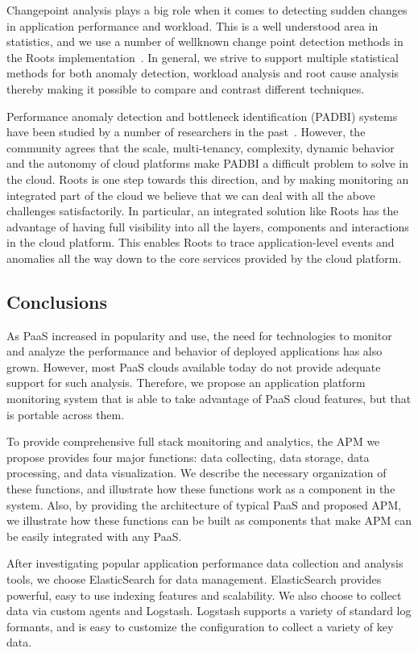 Changepoint analysis plays a big role when it comes to detecting
sudden changes in application performance and workload. This is a well
understood area in statistics, and we use a number of wellknown 
change point detection methods in the Roots implementation~\cite{killick2012optimal,cl93}. 
In general, we strive to support multiple statistical methods for
both anomaly detection, workload analysis and root cause analysis
thereby making it possible to compare and contrast different techniques.

Performance anomaly detection and bottleneck identification (PADBI) systems
have been studied by a number of researchers in the past~\cite{Ibidunmoye:2015:PAD:2808687.2791120}. 
However,
the community agrees that the scale, multi-tenancy, complexity,
dynamic behavior and the autonomy of cloud platforms make PADBI a
difficult problem to solve in the cloud. Roots is one step towards this direction,
and by making monitoring an integrated part of the cloud we believe
that we can deal with all the above challenges satisfactorily. In 
particular, an integrated solution like Roots has the advantage of
having full visibility into all the layers, components and interactions
in the cloud platform. This enables Roots to trace application-level
events and anomalies all the way down to the core services provided
by the cloud platform.

\subsection{Conclusions}
As PaaS increased in popularity and use, the need 
for technologies to monitor and analyze the performance and behavior of
deployed applications has also grown. 
However, most PaaS clouds available today do not provide adequate support
for such analysis.
Therefore, we propose an application platform monitoring system that 
is able to take advantage of PaaS cloud features, but that is portable
across them.

To provide comprehensive full stack monitoring and analytics, 
the APM we propose provides four major functions:
data collecting, data storage, data processing, and data visualization. 
We describe the necessary organization of
these functions, and illustrate how these functions work as 
a component in the system. Also, by providing the
architecture of typical PaaS and proposed APM, we illustrate how these functions can be built as components that
make APM can be easily integrated with any PaaS.

After investigating popular application performance data collection and analysis tools, we choose ElasticSearch for data management.
ElasticSearch provides powerful, easy to use indexing features and scalability. We also choose to collect data via custom agents and Logstash.
Logstash supports a variety of standard log formants,
and is easy to customize the configuration to collect a variety of key data.
